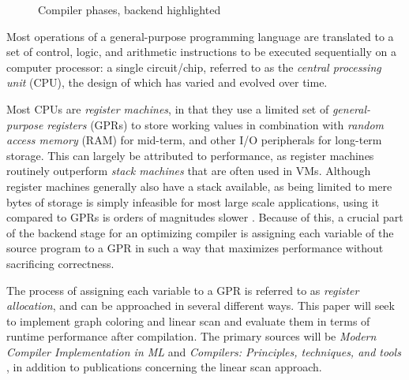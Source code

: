 \documentclass{article}
\begin{document}
\begin{figure}[h]
{}
\caption{Compiler phases, backend highlighted}\label{fig:phases}
\end{figure}
\noindent Most operations of a general-purpose programming language are translated to a set of control, logic, and arithmetic instructions to be executed sequentially on a computer processor: a single circuit/chip, referred to as the \textit{central processing unit} (CPU), the design of which has varied and evolved over time.

Most CPUs are \textit{register machines}, in that they use a limited set of \textit{general-purpose registers} (GPRs) to store working values in combination with \textit{random access memory} (RAM) for mid-term, and other I/O peripherals for long-term storage. This can largely be attributed to performance, as register machines routinely outperform \textit{stack machines} \parencite{ShiYunhe2008VmsS} that are often used in VMs.
Although register machines generally also have a stack available, as being limited to mere bytes of storage is simply infeasible for most large scale applications, using it compared to GPRs is orders of magnitudes slower \cite{latency}. %
Because of this, a crucial part of the backend stage for an optimizing compiler is assigning each variable  of the source program to a GPR in such a way that maximizes performance without sacrificing correctness.



The process of assigning each variable to a GPR is referred to as \textit{register allocation}, and can be approached in several different ways. This paper will seek to implement graph coloring and linear scan and evaluate them in terms of runtime performance after compilation. %
The primary sources will be \textit{Modern Compiler Implementation in ML} \parencite{tiger} and \textit{Compilers: Principles, techniques, and tools} \parencite{dragon}, in addition to publications concerning the linear scan approach.
\end{document}
